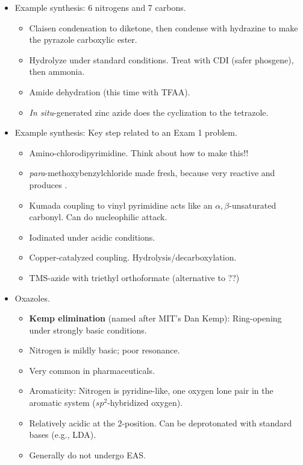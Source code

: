 \documentclass[../notes.tex]{subfiles}
\begin{document}
\begin{itemize}
\begin{itemize}
    \end{itemize}
    \item Example synthesis: 6 nitrogens and 7 carbons.
    \begin{itemize}
        \item Claisen condensation to diketone, then condense with hydrazine to make the pyrazole carboxylic ester.
        \item Hydrolyze under standard conditions. Treat with CDI (safer phosgene), then ammonia.
        \item Amide dehydration (this time with TFAA).
        \item \emph{In situ}-generated zinc azide does the cyclization to the tetrazole.
    \end{itemize}
    \item Example synthesis: Key step related to an Exam 1 problem.
    \begin{itemize}
        \item Amino-chlorodipyrimidine. Think about how to make this!!
        \item \emph{para}-methoxybenzylchloride made fresh, because very reactive and produces .
        \item Kumada coupling to vinyl pyrimidine acts like an $\alpha,\beta$-unsaturated carbonyl. Can do nucleophilic attack.
        \item Iodinated under acidic conditions.
        \item Copper-catalyzed  coupling. Hydrolysis/decarboxylation.
        \item TMS-azide with triethyl orthoformate (alternative to ??)
    \end{itemize}
    \item Oxazoles.
    \begin{itemize}
        \item \textbf{Kemp elimination} (named after MIT's Dan Kemp): Ring-opening under strongly basic conditions.
        \item Nitrogen is mildly basic; poor resonance.
        \item Very common in pharmaceuticals.
        \item Aromaticity: Nitrogen is pyridine-like, one oxygen lone pair in the aromatic system ($sp^2$-hybridized oxygen).
        \item Relatively acidic at the 2-position. Can be deprotonated with standard bases (e.g., LDA).
        \item Generally do not undergo EAS.

\end{itemize}
\end{itemize}
\end{document}

